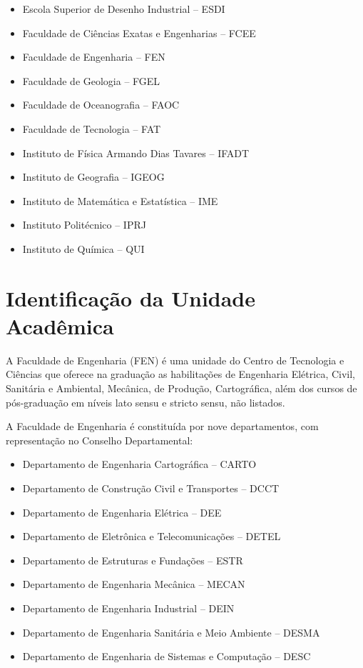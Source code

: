 \begin{itemize}

    \item Escola Superior de Desenho Industrial -- ESDI
    \item Faculdade de Ciências Exatas e Engenharias -- FCEE
    \item Faculdade de Engenharia -- FEN
    \item Faculdade de Geologia -- FGEL
    \item Faculdade de Oceanografia -- FAOC
    \item Faculdade de Tecnologia -- FAT
    \item Instituto de Física Armando Dias Tavares -- IFADT
    \item Instituto de Geografia -- IGEOG
    \item Instituto de Matemática e Estatística -- IME
    \item Instituto Politécnico -- IPRJ
    \item Instituto de Química -- QUI

\end{itemize}

\section{Identificação da Unidade Acadêmica}

A Faculdade de Engenharia (FEN) é uma unidade do Centro de Tecnologia e Ciências que oferece na graduação as habilitações de Engenharia Elétrica, Civil, Sanitária e Ambiental, Mecânica, de Produção, Cartográfica, além dos cursos de pós-graduação em níveis lato sensu e stricto sensu, não listados.

A Faculdade de Engenharia é constituída por nove departamentos, com representação no Conselho Departamental:

\begin{itemize}
    \item Departamento de Engenharia Cartográfica -- CARTO
    \item Departamento de Construção Civil e Transportes -- DCCT
    \item Departamento de Engenharia Elétrica -- DEE
    \item Departamento de Eletrônica e Telecomunicações -- DETEL
    \item Departamento de Estruturas e Fundações -- ESTR
    \item Departamento de Engenharia Mecânica -- MECAN
    \item Departamento de Engenharia Industrial -- DEIN
    \item Departamento de Engenharia Sanitária e Meio Ambiente -- DESMA
    \item Departamento de Engenharia de Sistemas e Computação -- DESC
\end{itemize}

